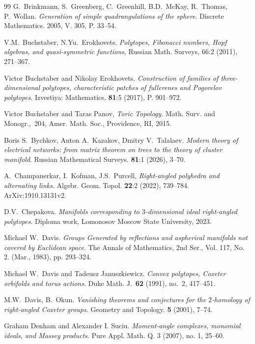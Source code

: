 \documentclass[12pt]{amsart}
\theoremstyle{definition}
\theoremstyle{remark}
\begin{document}
\begin{thebibliography}{99}
G.~Brinkmann,  S.~Greenberg,  C.~Greenhill, B.D.~McKay,  R.~Thomas,  P.~Wollan.  
\emph{Generation of simple quadrangulations of the sphere}.
Discrete Mathematics. 2005, V. 305, P. 33--54.

V.M.~Buchstaber, N.Yu.~Erokhovets.
\emph{Polytopes, Fibonacci numbers, Hopf algebras, and quasi-symmetric functions}, 
Russian Math. Surveys, 66:2 (2011), 271--367.

Victor Buchstaber and Nikolay Erokhovets. 
\emph{Construction of families of three-dimensional polytopes, characteristic patches of fullerenes and Pogorelov polytopes}. Izvestiya: Mathematics, {\bf 81}:5 (2017), P. 901--972.

Victor Buchstaber and  Taras Panov,
\emph{Toric Topology}. 
Math. Surv. and Monogr.,~204, Amer. Math. Soc., Providence, RI, 2015.

Boris S.~Bychkov, Anton A.~Kazakov, Dmitry V.~Talalaev.
\emph{Modern theory of electrical networks: from matrix theorem on trees to the theory
of cluster manifold}. Russian Mathematical Surveys. {\bf 81}:1 (2026), 3--70.

A.~Champanerkar, I.~Kofman, J.S.~Purcell, 
\emph{Right-angled polyhedra and alternating links}. 
Algebr. Geom. Topol. {\bf 22}:2 (2022), 739--784. ArXiv:1910.13131v2.

D.V.~Chepakova.
\emph{Manifolds corresponding to $3$-dimensional ideal right-angled polytopes}.
Diploma work, Lomonosov Moscow State University, 2023.

Michael W.~Davis.
\emph{Groups Generated by reflections and aspherical manifolds not covered by Euclidean space}.
The Annals of Mathematics, 2nd Ser., Vol. 117, No. 2. (Mar., 1983), pp. 293--324.

Michael W.~Davis and Tadeusz Januszkiewicz. 
\emph{Convex polytopes, Coxeter orbifolds and torus actions}. 
Duke Math. J.~{\bf62} (1991), no.~2, 417--451.

M.W.~Davis, B.~Okun.
\emph{Vanishing theorems and conjectures for the $2$-homology of right-angled Coxeter groups}.
Geometry and Topology. {\bf 5} (2001), 7--74. 

Graham Denham and Alexander I. Suciu.
\emph{Moment-angle complexes, monomial ideals, and Massey products}. 
Pure Appl. Math. Q. 3 (2007), no. 1, 25--60.


\end{thebibliography}
\end{document}
